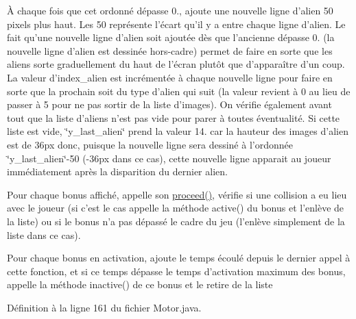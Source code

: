 À chaque fois que cet ordonné dépasse 0., ajoute une nouvelle ligne d'alien 50 pixels plus haut. Les 50 représente l'écart qu'il y a entre chaque ligne d'alien. Le fait qu'une nouvelle ligne d'alien soit ajoutée dès que l'ancienne dépasse 0. (la nouvelle ligne d'alien est dessinée hors-\/cadre) permet de faire en sorte que les aliens sorte graduellement du haut de l'écran plutôt que d'apparaître d'un coup. La valeur d'index\-\_\-alien est incrémentée à chaque nouvelle ligne pour faire en sorte que la prochain soit du type d'alien qui suit (la valeur revient à 0 au lieu de passer à 5 pour ne pas sortir de la liste d'images). On vérifie également avant tout que la liste d'aliens n'est pas vide pour parer à toutes éventualité. Si cette liste est vide, \char`\"{}y\-\_\-last\-\_\-alien\char`\"{} prend la valeur 14. car la hauteur des images d'alien est de 36px donc, puisque la nouvelle ligne sera dessiné à l'ordonnée \char`\"{}y\-\_\-last\-\_\-alien\char`\"{}-\/50 (-\/36px dans ce cas), cette nouvelle ligne apparait au joueur immédiatement après la disparition du dernier alien.

Pour chaque bonus affiché, appelle son \hyperlink{class_motor_a5333ff4fde112f55953849964f8ae7fa}{proceed()}, vérifie si une collision a eu lieu avec le joueur (si c'est le cas appelle la méthode active() du bonus et l'enlève de la liste) ou si le bonus n'a pas dépassé le cadre du jeu (l'enlève simplement de la liste dans ce cas).

Pour chaque bonus en activation, ajoute le temps écoulé depuis le dernier appel à cette fonction, et si ce temps dépasse le temps d'activation maximum des bonus, appelle la méthode inactive() de ce bonus et le retire de la liste

Définition à la ligne 161 du fichier Motor.\-java.



